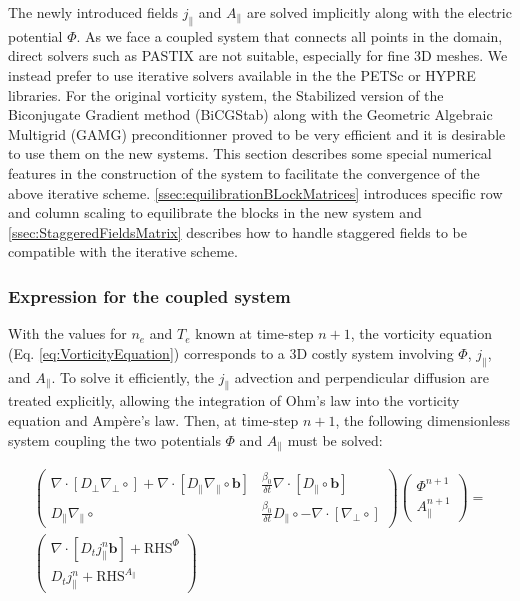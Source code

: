 The newly introduced fields $j_\parallel$ and $A_\parallel$ are solved implicitly along with the electric potential $\Phi$. As we face a coupled system that connects all points in the domain, direct solvers such as PASTIX are not suitable, especially for fine 3D meshes. We instead prefer to use iterative solvers available in the the PETSc or HYPRE libraries. For the original vorticity system, the Stabilized version of the Biconjugate Gradient method (BiCGStab) along with the Geometric Algebraic Multigrid (GAMG) preconditionner proved to be very efficient and it is desirable to use them on the new systems. This section describes some special numerical features in the construction of the system to facilitate the convergence of the above iterative scheme. \autoref{ssec:equilibrationBLockMatrices} introduces specific row and column scaling to equilibrate the blocks in the new system and \autoref{ssec:StaggeredFieldsMatrix} describes how to handle staggered fields to be compatible with the iterative scheme.

\subsubsection{Expression for the coupled system}

With the values for $n_e$ and $T_e$ known at time-step $n+1$, the vorticity equation (Eq. \ref{eq:VorticityEquation}) corresponds to a 3D costly system involving $\Phi$, $j_\parallel$, and $A_\parallel$. To solve it efficiently, the $j_\parallel$ advection and perpendicular diffusion are treated explicitly, allowing the integration of Ohm's law into the vorticity equation and Ampère's law. Then, at time-step $n+1$, the following dimensionless system coupling the two potentials $\Phi$ and $A_\parallel$ must be solved: \newline

\begin{align}
	\begin{pmatrix}
		\label{eq:implicitSytem}
		\nabla \cdot \left[ D_\perp \nabla_\perp \circ \right] + \nabla \cdot \left[ D_\parallel \nabla_\parallel \circ \mathbf{b} \right] & 
		\frac{\beta_0}{\delta t} \nabla \cdot \left[ D_\parallel \circ \mathbf{b} \right] \\
		D_\parallel \nabla_\parallel \circ &
		\frac{\beta_0}{\delta t} D_\parallel \circ - \nabla \cdot \left[ \nabla_\perp \circ \right]
	\end{pmatrix}
	\begin{pmatrix}
		\Phi^{n+1} \\ A_\parallel^{n+1}
	\end{pmatrix} 
	= \nonumber \\
	\begin{pmatrix}
		\nabla \cdot \left[ D_t j^{n}_\parallel \mathbf{b} \right] + \text{RHS}^\Phi \\
		D_t j^{n}_\parallel + \text{RHS}^{A_\parallel}
	\end{pmatrix}
\end{align}

